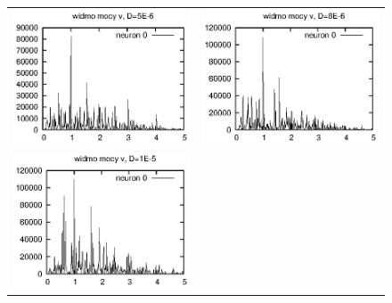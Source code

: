 \documentclass[12pt]{article}
\begin{document}
  \begin{figure}
  \centering
  \begin{tabular}{cc}
    \includegraphics{referat_graph/D5e-6.eps} & 
    \includegraphics{referat_graph/D8e-6.eps} \\
    \includegraphics{referat_graph/D1e-5.eps} &

\end{tabular}
\end{figure}
\end{document}
